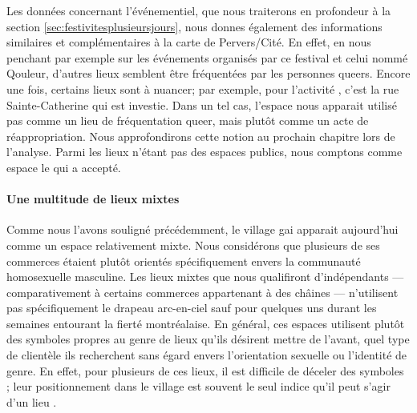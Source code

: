 Les données concernant l'événementiel, que nous traiterons en profondeur à la section \ref{sec:festivitesplusieursjours}, nous donnes également des informations similaires et complémentaires à la carte de Pervers/Cité.
En effet, en nous penchant par exemple sur les événements organisés par ce festival et celui nommé Qouleur, d'autres lieux semblent être fréquentées par les personnes queers.
Encore une fois, certains lieux sont à nuancer; par exemple, pour l'activité , c'est la rue Sainte-Catherine qui est investie.
Dans un tel cas, l'espace nous apparait utilisé pas comme un lieu de fréquentation queer, mais plutôt comme un acte de réappropriation.
Nous approfondirons cette notion au prochain chapitre lors de l'analyse.
Parmi les lieux n'étant pas des espaces publics, nous comptons comme espace le \mai{} qui a accepté.

\paragraph{Une multitude de lieux mixtes}
Comme nous l'avons souligné précédemment, le village gai apparait aujourd'hui comme un espace relativement mixte.
Nous considérons que plusieurs de ses commerces étaient plutôt orientés spécifiquement envers la communauté homosexuelle masculine.
Les lieux mixtes que nous qualifiront d'indépendants --- comparativement à certains commerces appartenant à des châines --- n'utilisent pas spécifiquement le drapeau arc-en-ciel sauf pour quelques uns durant les semaines entourant la fierté montréalaise.
En général, ces espaces utilisent plutôt des symboles propres au genre de lieux qu'ils désirent mettre de l'avant, quel type de clientèle ils recherchent sans égard envers l'orientation sexuelle ou l'identité de genre.
En effet, pour plusieurs de ces lieux, il est difficile de déceler des symboles \lgbt{}; leur positionnement dans le village est souvent le seul indice qu'il peut s'agir d'un lieu \lgbt{}.

